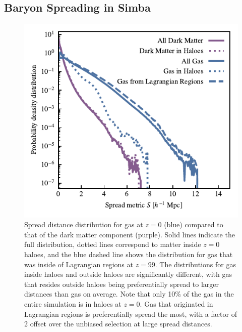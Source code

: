 \documentclass[fleqn,usenatbib]{mnras}
\newcommand{\simba}{{\sc Simba}}
\begin{document}
\subsection{Baryon Spreading in \simba{}}

\begin{figure}
    \centering
    \includegraphics{figures/s50j7kAHF/distance_plot_split_by_component+AHF_updated.pdf}
    \vspace{-0.7cm}
    \caption{Spread distance distribution for gas at $z=0$ (blue) compared to
    that of the dark matter component (purple). Solid lines indicate the full
    distribution, dotted lines correspond to matter inside $z=0$ haloes, and
    the blue dashed line shows the distribution for gas that was inside of
    Lagrangian regions at $z=99$. The distributions for gas inside haloes and
    outside haloes are significantly different, with gas that resides outside
    haloes being preferentially spread to larger distances than gas on
    average. Note that only 10\% of the gas in the entire simulation is in
    haloes at $z=0$. Gas that originated in Lagrangian regions is
    preferentially spread the most, with a factor of 2 offset over the
    unbiased selection at large spread distances.}
    \label{fig:distbaryon}
\end{figure}
\end{document}

